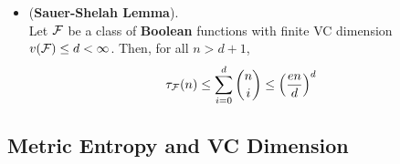 \documentclass[11pt]{article}
\begin{document}
\begin{itemize}
\item \begin{lemma} (\textbf{Sauer-Shelah Lemma}). \citep{vershynin2018high, wainwright2019high}\\
Let ${\mathcal F}$ be a class of \textbf{Boolean} functions with finite VC dimension $v({\mathcal F}) \le d < \infty$. Then, for all $n > d+1$, 
\begin{align}
\tau_{{\mathcal F}}(n) &\le \sum_{i=0}^{d}{{n}\choose{i}}\le \left(\frac{en}{d}\right)^{d} \label{eqn: sauer_lemma}
\end{align}
\end{lemma}
\end{itemize}

\subsection{Metric Entropy and VC Dimension}
\end{document}
